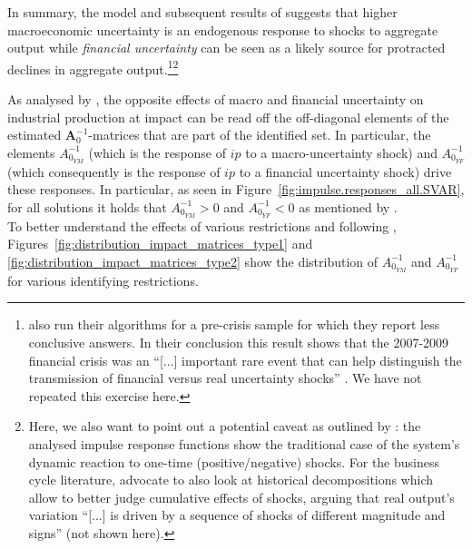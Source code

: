 \documentclass[a4paper,11pt,listof=nochaptergap,oneside,pointednumbers,bibtotoc,bigheadings,liststotoc,hidelinks]{scrbook}
\theoremstyle{mysatz}
\theoremstyle{mydefinition}
\theoremstyle{mytheorem}
\theoremstyle{mybemerkung}
\newcommand{\vect}[1]{\boldsymbol{\mathbf{#1}}}
\begin{document}
In summary, the model and subsequent results of \citet{ludvigsonetal:19} suggests that higher macroeconomic uncertainty is an endogenous response to shocks to aggregate output while \textit{financial uncertainty} can be seen as a likely source for protracted declines in aggregate output.\footnote{\citet{ludvigsonetal:18} also run their algorithms for a pre-crisis sample for which they report less conclusive answers. In their conclusion this result shows that the 2007-2009 financial crisis was an ``[...] important rare event that can help distinguish the transmission of financial versus real uncertainty shocks'' \citet[p. 25]{ludvigsonetal:18}. We have not repeated this exercise here.}\footnote{Here, we also want to point out a potential caveat as outlined by \citet{lutkepohlkilian:17}: the analysed impulse response functions show the traditional case of the system's dynamic reaction to one-time (positive/negative) shocks. For the business cycle literature, \citet[p. 120]{lutkepohlkilian:17} advocate to also look at historical decompositions which allow to better judge cumulative effects of shocks, arguing that real output's variation ``[...] is driven by a sequence of shocks of different magnitude and signs'' (not shown here).}

As analysed by \citet{ludvigsonetal:19}, the opposite effects of macro and financial uncertainty on industrial production at impact can be read off the off-diagonal elements of the estimated $\vect{A}_0^{-1}$-matrices that are part of the identified set. In particular, the elements $A_{0_{YM}}^{-1}$ (which is the response of $ip$ to a macro-uncertainty shock) and $A_{0_{YF}}^{-1}$ (which consequently is the response of $ip$ to a financial uncertainty shock) drive these responses. In particular, as seen in Figure~\ref{fig:impulse.responses_all.SVAR}, for all solutions it holds that $A_{0_{YM}}^{-1} > 0$ and $A_{0_{YF}}^{-1} < 0$ as mentioned by \citet{ludvigsonetal:19}.\\

To better understand the effects of various restrictions and following \citet{ludvigsonetal:19}, Figures~\ref{fig:distribution_impact_matrices_type1} and \ref{fig:distribution_impact_matrices_type2} show the distribution of $A_{0_{YM}}^{-1}$ and $A_{0_{YF}}^{-1}$ for various identifying restrictions.
\end{document}
